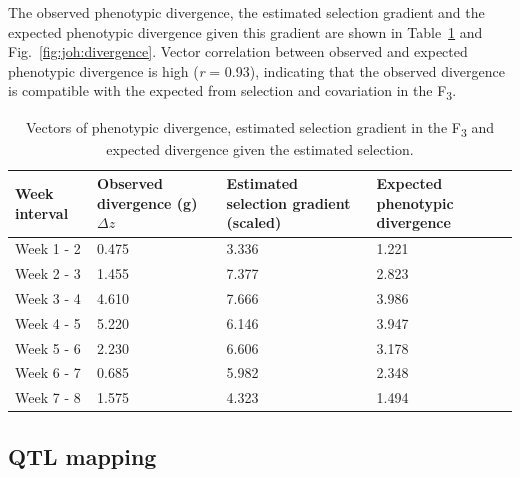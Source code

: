\begin{refsection}
The observed phenotypic divergence, the estimated selection gradient and
the expected phenotypic divergence given this gradient are shown in
Table~\ref{joh:vectors} and Fig.~\ref{fig:joh:divergence}. Vector correlation between observed and expected
phenotypic divergence is high (\emph{r} = 0.93), indicating that the observed
divergence is compatible with the expected from selection and
covariation in the F\textsubscript{3}.

\begin{table}[htbp]
	\caption[Evolutionary vectors]{Vectors of phenotypic divergence, estimated selection gradient
			 in the F\textsubscript{3} and expected divergence given the estimated
			 selection.}
	\vspace{1em}
	\centering
	\begin{tabular}{l|p{30mm} p{30mm} p{40mm}}
		\toprule
		Week interval & Observed \newline divergence (g) $\Delta z$ & Estimated \newline selection gradient (scaled) & Expected \newline phenotypic divergence \\
		\midrule
		Week 1 - 2 & 0.475 & 3.336 & 1.221 \\
		Week 2 - 3 & 1.455 & 7.377 & 2.823 \\
		Week 3 - 4 & 4.610 & 7.666 & 3.986 \\
		Week 4 - 5 & 5.220 & 6.146 & 3.947 \\
		Week 5 - 6 & 2.230 & 6.606 & 3.178 \\
		Week 6 - 7 & 0.685 & 5.982 & 2.348 \\
		Week 7 - 8 & 1.575 & 4.323 & 1.494 \\
		\bottomrule
	\end{tabular}
	\label{joh:vectors}
\end{table}

\subsection{QTL mapping}


\end{refsection}
